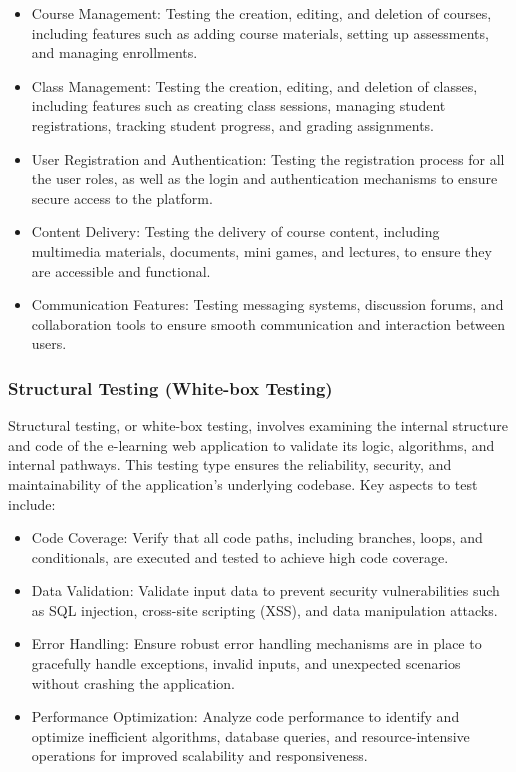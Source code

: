 		\begin{itemize}
			\item Course Management: Testing the creation, editing, and deletion of courses, including features such as adding course materials, setting up assessments, and managing enrollments.
			\item Class Management: Testing the creation, editing, and deletion of classes, including features such as creating class sessions, managing student registrations, tracking student progress, and grading assignments.
			\item User Registration and Authentication: Testing the registration process for all the user roles, as well as the login and authentication mechanisms to ensure secure access to the platform.
			\item Content Delivery: Testing the delivery of course content, including multimedia materials, documents, mini games, and lectures, to ensure they are accessible and functional.
			\item Communication Features: Testing messaging systems, discussion forums, and collaboration tools to ensure smooth communication and interaction between users.
		\end{itemize}

		\subsubsection{Structural Testing (White-box Testing)}

		Structural testing, or white-box testing, involves examining the internal structure and code of the e-learning web application to validate its logic, algorithms, and internal pathways. This testing type ensures the reliability, security, and maintainability of the application's underlying codebase. Key aspects to test include:

		\begin{itemize}
			\item Code Coverage: Verify that all code paths, including branches, loops, and conditionals, are executed and tested to achieve high code coverage.
			\item Data Validation: Validate input data to prevent security vulnerabilities such as SQL injection, cross-site scripting (XSS), and data manipulation attacks.
			\item Error Handling: Ensure robust error handling mechanisms are in place to gracefully handle exceptions, invalid inputs, and unexpected scenarios without crashing the application.
			\item Performance Optimization: Analyze code performance to identify and optimize inefficient algorithms, database queries, and resource-intensive operations for improved scalability and responsiveness.
		\end{itemize}
		
